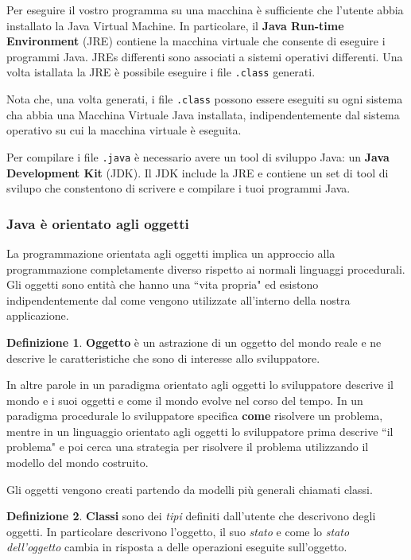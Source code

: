 \documentclass{article}
\theoremstyle{definition}
\newtheorem{mydef}{Definizione}
\begin{document}
Per eseguire il vostro programma su una macchina \`e sufficiente che l'utente abbia installato 
la Java Virtual Machine. 
In particolare, il \textbf{Java Run-time Environment} (JRE) contiene la macchina virtuale che consente di eseguire i programmi Java.  
JREs differenti sono associati a sistemi operativi differenti. 
Una volta istallata la JRE \`e possibile eseguire i file \texttt{.class} generati.

Nota che, una volta generati, i file \texttt{.class} possono essere eseguiti su ogni sistema cha abbia una Macchina Virtuale Java installata, indipendentemente dal sistema operativo su cui la macchina virtuale \`e eseguita.

Per compilare i file \texttt{.java} \`e necessario avere un tool di sviluppo Java: un \textbf{Java Development Kit} (JDK). 
Il JDK include la JRE e contiene un set di tool di svilupo che constentono di scrivere e compilare i tuoi programmi Java.




\subsubsection{Java \`e orientato agli oggetti}
La programmazione orientata agli oggetti implica un approccio alla programmazione completamente diverso rispetto ai normali linguaggi procedurali. Gli oggetti sono entit\`a che hanno una ``vita propria" ed esistono indipendentemente dal come vengono utilizzate all'interno della nostra applicazione. 

\begin{mydef} \textbf{Oggetto} \`e un astrazione di un oggetto del mondo reale e ne descrive le caratteristiche  che sono di interesse allo sviluppatore.
\end{mydef}

In altre parole in un paradigma orientato agli oggetti lo sviluppatore descrive il mondo e i suoi oggetti e come il mondo evolve nel corso del tempo. 
In un paradigma procedurale lo sviluppatore specifica \textbf{come} risolvere un problema, mentre in un linguaggio orientato agli oggetti lo sviluppatore prima descrive ``il problema" e poi cerca una strategia per risolvere il problema utilizzando il modello del mondo costruito.

Gli oggetti vengono creati partendo da modelli pi\`u generali chiamati classi. 

\begin{mydef} \textbf{Classi} sono dei \emph{tipi} definiti dall'utente che descrivono degli oggetti. In particolare descrivono l'oggetto, il suo \emph{stato} e come lo \emph{stato dell'oggetto} cambia in risposta a delle operazioni eseguite sull'oggetto.
\end{mydef}
\end{document}
